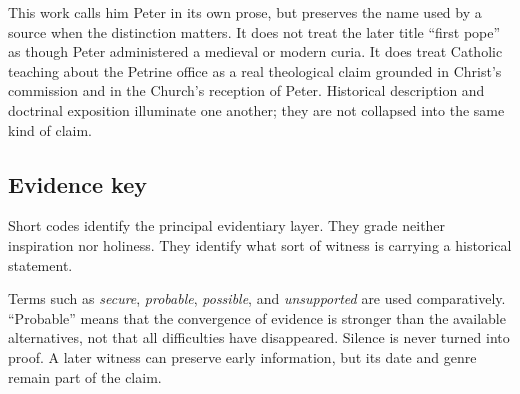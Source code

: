 This work calls him Peter in its own prose, but preserves the name used by a
source when the distinction matters. It does not treat the later title
``first pope'' as though Peter administered a medieval or modern curia. It
does treat Catholic teaching about the Petrine office as a real theological
claim grounded in Christ's commission and in the Church's reception of
Peter. Historical description and doctrinal exposition illuminate one
another; they are not collapsed into the same kind of claim.

\subsection{Evidence key}

Short codes identify the principal evidentiary layer. They grade neither
inspiration nor holiness. They identify what sort of witness is carrying a
historical statement.

\begin{evidencelegend}
\end{evidencelegend}

Terms such as \emph{secure}, \emph{probable}, \emph{possible}, and
\emph{unsupported} are used comparatively. ``Probable'' means that the
convergence of evidence is stronger than the available alternatives, not that
all difficulties have disappeared. Silence is never turned into proof. A
later witness can preserve early information, but its date and genre remain
part of the claim.

